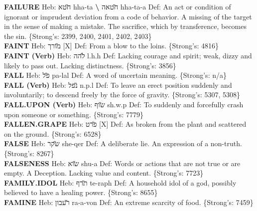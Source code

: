 {\textbf{FAILURE} Heb: {\large\H חטא} hha-ta \textbf{\textbackslash{}} {\large\H חטאה} hha-ta-a Def: An act or condition of ignorant or imprudent deviation from a code of behavior. A missing of the target in the sense of making a mistake. The sacrifice, which by transference, becomes the sin. \{Strong's: 2399, 2400, 2401, 2402, 2403\}\hfill{}\\

\textbf{FAINT} Heb: {\large\H מורך} {[}X{]} Def: From a blow to the loins. \{Strong's: 4816\}\hfill{}\\

\textbf{FAINT (Verb)} Heb: {\large\H להה} l.h.h Def: Lacking courage and spirit; weak, dizzy and likely to pass out. Lacking distinctness. \{Strong's: 3856\}\hfill{}\\

\textbf{FALL} Heb: {\large\H פל} pa-lal Def: A word of uncertain meaning. \{Strong's: n/a\}\hfill{}\\

\textbf{FALL (Verb)} Heb: {\large\H נפל} n.p.l Def: To leave an erect position suddenly and involuntarily; to descend freely by the force of gravity. \{Strong's: 5307, 5308\}\hfill{}\\

\textbf{FALL.UPON (Verb)} Heb: {\large\H שוף} sh.w.p Def: To suddenly and forcefully crash upon someone or something. \{Strong's: 7779\}\hfill{}\\

\textbf{FALLEN.GRAPE} Heb: {\large\H פרט} {[}X{]} Def: As broken from the plant and scattered on the ground. \{Strong's: 6528\}\hfill{}\\

\textbf{FALSE} Heb: {\large\H שקר} she-qer Def: A deliberate lie. An expression of a non-truth. \{Strong's: 8267\}\hfill{}\\

\textbf{FALSENESS} Heb: {\large\H שוא} shu-a Def: Words or actions that are not true or are empty. A Deception. Lacking value and content. \{Strong's: 7723\}\hfill{}\\

\textbf{FAMILY.IDOL} Heb: {\large\H תרף} te-raph Def: A household idol of a god, possibly believed to have a healing power. \{Strong's: 8655\}\hfill{}\\

\textbf{FAMINE} Heb: {\large\H רעבון} ra-a-von Def: An extreme scarcity of food. \{Strong's: 7459\}\hfill{}\\

}
